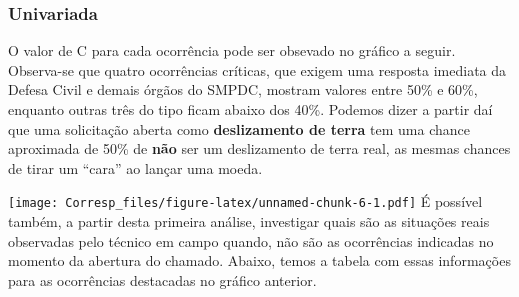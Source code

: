 \documentclass[
]{article}
\newenvironment{Shaded}{\begin{snugshade}}{\end{snugshade}}
\newcommand{\DataTypeTok}[1]{\textcolor[rgb]{0.13,0.29,0.53}{#1}}
\newcommand{\DecValTok}[1]{\textcolor[rgb]{0.00,0.00,0.81}{#1}}
\newcommand{\KeywordTok}[1]{\textcolor[rgb]{0.13,0.29,0.53}{\textbf{#1}}}
\newcommand{\NormalTok}[1]{#1}
\newcommand{\OperatorTok}[1]{\textcolor[rgb]{0.81,0.36,0.00}{\textbf{#1}}}
\newcommand{\OtherTok}[1]{\textcolor[rgb]{0.56,0.35,0.01}{#1}}
\newcommand{\StringTok}[1]{\textcolor[rgb]{0.31,0.60,0.02}{#1}}
\begin{document}
\hypertarget{univariada}{%
\subsubsection{Univariada}\label{univariada}}

O valor de C para cada ocorrência pode ser obsevado no gráfico a seguir.
Observa-se que quatro ocorrências críticas, que exigem uma resposta
imediata da Defesa Civil e demais órgãos do SMPDC, mostram valores entre
50\% e 60\%, enquanto outras três do tipo ficam abaixo dos 40\%. Podemos
dizer a partir daí que uma solicitação aberta como \textbf{deslizamento
de terra} tem uma chance aproximada de 50\% de \textbf{não} ser um
deslizamento de terra real, as mesmas chances de tirar um ``cara'' ao
lançar uma moeda.

\texttt{[image: Corresp\_files/figure-latex/unnamed-chunk-6-1.pdf]} É
possível também, a partir desta primeira análise, investigar quais são
as situações reais observadas pelo técnico em campo quando, não são as
ocorrências indicadas no momento da abertura do chamado. Abaixo, temos a
tabela com essas informações para as ocorrências destacadas no gráfico
anterior.

\begin{Shaded}
\end{Shaded}
\end{document}
